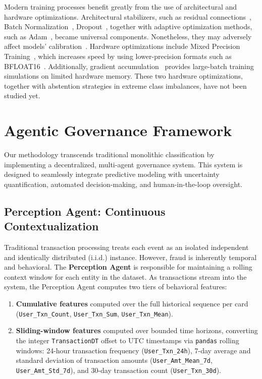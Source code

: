 \documentclass[12pt,a4paper]{article}
\begin{document}
Modern training processes benefit greatly from the use of architectural and
hardware optimizations. Architectural stabilizers, such as residual
connections~\cite{b23}, Batch Normalization~\cite{b24}, Dropout~\cite{b25},
together with adaptive optimization methods, such as Adam~\cite{b26}, became
universal components. Nonetheless, they may adversely affect models'
calibration~\cite{b27}. Hardware optimizations include Mixed Precision
Training~\cite{b28}, which increases speed by using lower-precision formats such
as BFLOAT16~\cite{b29}. Additionally, gradient accumulation~\cite{b30} provides
large-batch training simulations on limited hardware memory. These two hardware
optimizations, together with abstention strategies in extreme class imbalances,
have not been studied yet.

\section{Agentic Governance Framework}
\label{sec:agentic_framework}

Our methodology transcends traditional monolithic classification by implementing
a decentralized, multi-agent governance system. This system is designed to
seamlessly integrate predictive modeling with uncertainty quantification,
automated decision-making, and human-in-the-loop oversight.

\subsection{Perception Agent: Continuous Contextualization}

Traditional transaction processing treats each event as an isolated independent
and identically distributed (i.i.d.) instance. However, fraud is inherently
temporal and behavioral. The \textbf{Perception Agent} is responsible for
maintaining a rolling context window for each entity in the dataset. As
transactions stream into the system, the Perception Agent computes two tiers of
behavioral features:

\begin{enumerate}
  \item \textbf{Cumulative features} computed over the full historical sequence
        per card (\texttt{User\_Txn\_Count}, \texttt{User\_Txn\_Sum},
        \texttt{User\_Txn\_Mean}).
  \item \textbf{Sliding-window features} computed over bounded time horizons,
        converting the integer \texttt{TransactionDT} offset to UTC timestamps
        via \texttt{pandas} rolling windows: 24-hour transaction frequency
        (\texttt{User\_Txn\_24h}), 7-day average and standard deviation of
        transaction amounts (\texttt{User\_Amt\_Mean\_7d},
        \texttt{User\_Amt\_Std\_7d}), and 30-day transaction count
        (\texttt{User\_Txn\_30d}).
\end{enumerate}
\end{document}
